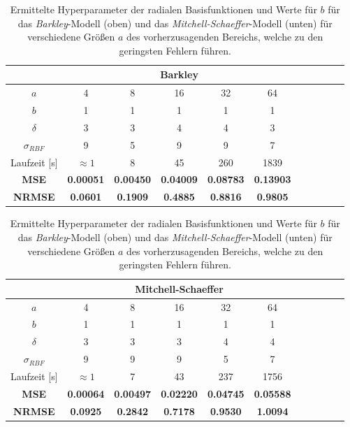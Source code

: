 \begin{table}[h]
	\centering

	\begin{tabular}{ccccccccccc}
		\hline
		\multicolumn{1}{c}{} & \multicolumn{5}{c}{Barkley}\\ 
		\hline
		\rule[-1ex]{0pt}{2.5ex} $a$ & 4 & 8 & 16 & 32 & 64\\ 
		\rule[-1ex]{0pt}{2.5ex} $b$ & 1 & 1 & 1  & 1  & 1 \\ 
		\rule[-1ex]{0pt}{2.5ex} $\delta$ & 3 & 3 & 4 & 4 & 3 \\ 
		\rule[-1ex]{0pt}{2.5ex} $\sigma_{RBF}$ & 9 & 5 & 9 & 9 & 7\\ 
		\rule[-1ex]{0pt}{2.5ex} Laufzeit [s] & $\approx 1$ & 8 & 45 & 260 & 1839\\ 
		\rule[-1ex]{0pt}{2.5ex} \textbf{MSE} & \textbf{0.00051} & \textbf{0.00450} & \textbf{0.04009} & \textbf{0.08783} & \textbf{0.13903}\\ 
		\rule[-1ex]{0pt}{2.5ex} \textbf{NRMSE} & \textbf{0.0601} & \textbf{0.1909} & \textbf{0.4885} & \textbf{0.8816} & \textbf{0.9805} \\ 
		\hline 
	\end{tabular} 
	
	\vspace{0.75cm}

	\centering

	\begin{tabular}{ccccccccccc}
		\hline
		\multicolumn{1}{c}{} & \multicolumn{5}{c}{Mitchell-Schaeffer} \\ 
		\hline 
		\rule[-1ex]{0pt}{2.5ex} $a$ & 4 & 8 & 16 & 32 & 64 \\ 
		\rule[-1ex]{0pt}{2.5ex} $b$ & 1 & 1 & 1  & 1  & 1\\ 
		\rule[-1ex]{0pt}{2.5ex} $\delta$ & 3 & 3 & 3 & 4 & 4 \\ 
		\rule[-1ex]{0pt}{2.5ex} $\sigma_{RBF}$ & 9 & 9 & 9 & 5 & 7 \\ 
		\rule[-1ex]{0pt}{2.5ex} Laufzeit [s] & $\approx 1$ & 7 & 43 & 237 & 1756\\
		\rule[-1ex]{0pt}{2.5ex} \textbf{MSE} & \textbf{0.00064} & \textbf{0.00497} & \textbf{0.02220} & \textbf{0.04745} & \textbf{0.05588} \\ 
		\rule[-1ex]{0pt}{2.5ex} \textbf{NRMSE} & \textbf{0.0925} & \textbf{0.2842} & \textbf{0.7178} & \textbf{0.9530} & \textbf{1.0094} \\ 
		\hline 
	\end{tabular} 

	\caption{Ermittelte Hyperparameter der radialen Basisfunktionen und Werte für $b$ für das \textit{Barkley}-Modell (oben) und das \textit{Mitchell-Schaeffer}-Modell (unten) für verschiedene Größen $a$ des vorherzusagenden Bereichs, welche zu den geringsten Fehlern führen.}
\label{tab:exp_inner_cross_rbf_results}
\end{table}

